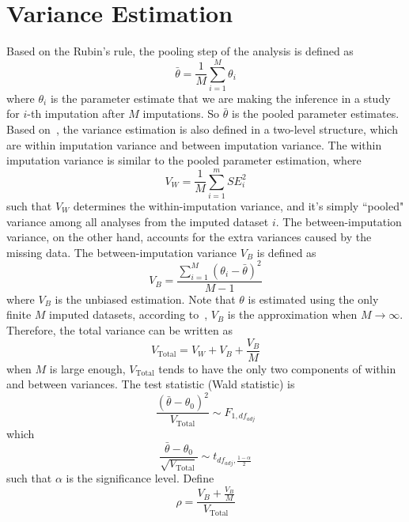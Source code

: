 \section{Variance Estimation}
Based on the Rubin's rule, the pooling step of the analysis is defined as 
\begin{equation} 
    \bar{\theta}=\frac{1}{M}\sum_{i=1}^M\theta_i
\end{equation}
where $\theta_i$ is the parameter estimate that we are making the inference in a study for $i$-th imputation after $M$ imputations. 
So $\bar{\theta}$ is the pooled parameter estimates. 
Based on~\citet{barnard1999miscellanea}, the variance estimation is also defined in a two-level structure, which are within imputation variance and between imputation variance. 
The within imputation variance is similar to the pooled parameter estimation, where 
\begin{equation} 
    V_W=\frac{1}{M}\sum_{i=1}^mSE_i^2
\end{equation}
such that $V_W$ determines the within-imputation variance, and it's simply ``pooled" variance among all analyses from the imputed dataset $i$. 
The between-imputation variance, on the other hand, accounts for the extra variances caused by the missing data. 
The between-imputation variance $V_B$ is defined as 
\begin{equation} 
    V_B=\frac{\sum_{i=1}^M(\theta_i-\bar{\theta})^2}{M-1}
\end{equation}
where $V_B$ is the unbiased estimation. 
Note that $\theta$ is estimated using the only finite $M$ imputed datasets, according to~\citet{van2018flexible}, $V_B$ is the approximation when $M\rightarrow\infty$.
Therefore, the total variance can be written as
\begin{equation} 
    V_{\text{Total}}=V_W+V_B+\frac{V_B}{M}
\end{equation}
when $M$ is large enough, $V_{\text{Total}}$ tends to have the only two components of within and between variances. 
The test statistic (Wald statistic) is 
\begin{equation} 
    \frac{(\bar{\theta}-\theta_0)^2}{V_{\text{Total}}}\sim F_{1,df_{adj}}
\end{equation}
which 
\begin{equation} 
    \frac{\bar{\theta}-\theta_0}{\sqrt{V_{\text{Total}}}}\sim t_{df_{adj}, \frac{1-\alpha}{2}}
\end{equation}
such that $\alpha$ is the significance level. 
Define 
\begin{equation}
    \rho=\frac{V_B+\frac{V_B}{M}}{V_{\text{Total}}}
\end{equation}
